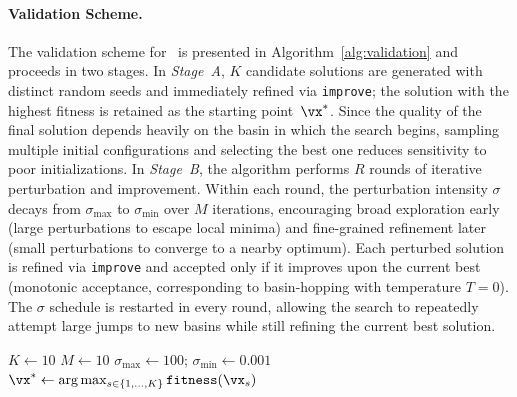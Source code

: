 \documentclass[sigconf]{acmart}
\begin{document}
\paragraph{Validation Scheme.}
The validation scheme for \improvevolve\ is presented in Algorithm~\ref{alg:validation} and proceeds in two stages.
In \emph{Stage~A}, $K$ candidate solutions are generated with distinct random seeds and immediately refined via \texttt{improve}; the solution with the highest fitness is retained as the starting point~$\vx^*$. Since the quality of the final solution depends heavily on the basin in which the search begins, sampling multiple initial configurations and selecting the best one reduces sensitivity to poor initializations.
In \emph{Stage~B}, the algorithm performs $R$ rounds of iterative perturbation and improvement. Within each round, the perturbation intensity $\sigma$ decays from $\sigma_{\max}$ to $\sigma_{\min}$ over $M$ iterations, encouraging broad exploration early (large perturbations to escape local minima) and fine-grained refinement later (small perturbations to converge to a nearby optimum). Each perturbed solution is refined via \texttt{improve} and accepted only if it improves upon the current best (monotonic acceptance, corresponding to basin-hopping with temperature $T = 0$). The $\sigma$ schedule is restarted in every round, allowing the search to repeatedly attempt large jumps to new basins while still refining the current best solution.

\begin{algorithm}[ht]
\caption{Validation Scheme for \improvevolve}\label{alg:validation}
\BlankLine
{}
$K \gets 10$ 
$M \gets 10$ 
$\sigma_{\max} \gets 100$; \quad $\sigma_{\min} \gets 0.001$\;
\BlankLine
{}
$\vx^* \gets \arg\max_{s \in \{1,\ldots,K\}} \texttt{fitness}(\vx_s)$\;
\BlankLine
{}
\Return{$\vx^*$}
\end{algorithm}
\end{document}
